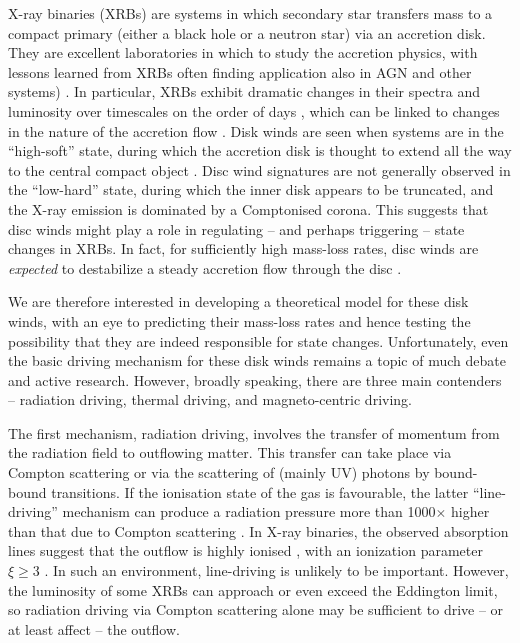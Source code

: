 \documentclass[a4paper,fleqn,usenatbib]{mnras}
\begin{document}
X-ray binaries (XRBs) are systems in which secondary star transfers mass to a compact primary (either a black hole or a neutron star)
via an accretion disk. They are excellent laboratories in which to
study the accretion physics, with lessons learned from XRBs often finding application also in AGN and other systems) \citep{2003MNRAS.345L..19M,2004A&A...414..895F,2006MNRAS.372.1366K,
2001MNRAS.323L..26U,
2015SciA....1E0686S,
2014MNRAS.438.1233S,
2013MNRAS.431.2535S,
2012MNRAS.421.2854S,	
2008Sci...320.1318K,
2018MNRAS.481.2140A,
2015MNRAS.448.2430V}.
In particular, XRBs exhibit dramatic changes in their spectra and luminosity over timescales on the order of days
\cite[e.g.][]{1999ApJ...520..776S,2004ApJ...610..378P}, which can be
linked to changes in the nature of the accretion flow
\cite[e.g.][]{1995PASP..107.1207N,2012Sci...337..540F}. Disk winds are 
seen when systems are in the ``high-soft'' state, during which the accretion disk is thought to extend all the way to the 
central compact object \cite[][although see \citealt{2016ApJ...830L...5H}]{2012MNRAS.422L..11P}. Disc wind signatures are not generally
observed in the ``low-hard'' state, during which the inner disk appears to be truncated, and the X-ray emission is dominated by a
Comptonised corona. This suggests that disc winds might play a role in
regulating -- and perhaps triggering -- state changes in XRBs. In
fact, for sufficiently high mass-loss rates, disc winds are {\em
  expected} to destabilize a steady accretion flow through the 
disc \citep{1986ApJ...306...90S}.

We are therefore interested in developing a theoretical model for
these disk winds, with an eye to 
predicting their mass-loss rates and hence testing the possibility
that they are indeed responsible for state changes. Unfortunately, even the
basic driving mechanism for these disk winds remains a topic of much
debate and active research. However, broadly speaking, there are three main contenders --
radiation driving, thermal driving, and magneto-centric driving. 

The first mechanism, radiation driving, involves the transfer of
momentum from the radiation field to outflowing matter. This transfer
can take place via Compton scattering or via the scattering of (mainly
UV) photons by bound-bound transitions. If the ionisation state of the gas is 
favourable, the latter ``line-driving'' mechanism can
produce a radiation pressure more than 1000$\times$ higher than that
due to Compton scattering \citep{1975ApJ...195..157C,
1995ApJ...454..410G}. In X-ray binaries, 
the observed absorption lines suggest that the outflow is highly ionised \citep[e.g.][]{2009ApJ...701..865K,
2018ApJ...861...26A}, with an ionization parameter $\xi \geq 3$
\citep{2016AN....337..368D}. In such an environment, line-driving is
unlikely to be important. However, the luminosity of some XRBs can
approach or even exceed the Eddington limit, so radiation driving via
Compton scattering alone may be sufficient to drive -- or at least
affect -- the outflow.
\end{document}
